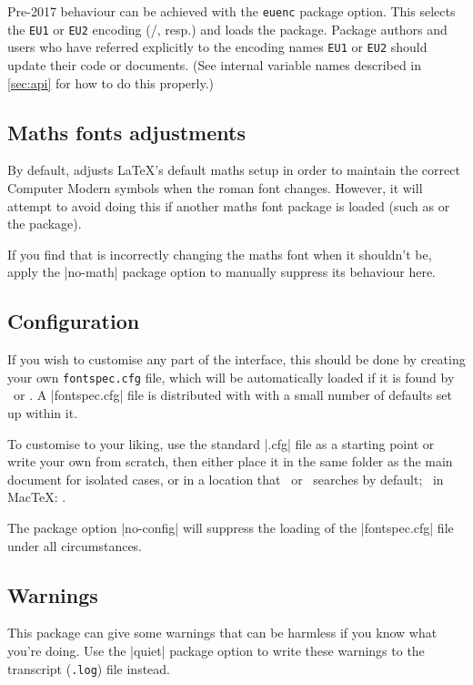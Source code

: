 \documentclass[a4paper]{l3doc}
\begin{document}
Pre-2017 behaviour can be achieved with the \texttt{euenc} package option.
This selects the \texttt{EU1} or \texttt{EU2} encoding (\XeTeX/\LuaTeX, resp.) and loads the  package.
Package authors and users who have referred explicitly to the encoding names \texttt{EU1} or \texttt{EU2} should update their code or documents.
(See internal variable names described in \vref{sec:api} for how to do this properly.)


\subsection{Maths fonts adjustments}
By default,  adjusts \LaTeX's default maths setup in order to maintain the correct Computer Modern symbols when the roman font changes.
However, it will attempt to avoid doing this if another maths font package is loaded (such as  or the  package).

If you find that  is incorrectly changing the maths font when it shouldn't be, apply the |no-math| package option to manually suppress its behaviour here.


\subsection{Configuration}
\label{sec:config}

If you wish to customise any part of the
 interface, this should be done by creating your own
\texttt{fontspec.cfg} file,
which will be automatically loaded if it is found by \XeTeX\ or \LuaTeX.
A |fontspec.cfg| file is distributed with  with a small number of defaults set up within it.

To customise  to your liking, use the standard |.cfg| file as a starting point or write your own from scratch, then either place it in the same folder as the main document for isolated cases, or in a location
that \XeTeX\ or \LuaTeX\ searches by default; \eg\ in Mac\TeX: .

The package option |no-config| will suppress the loading of the |fontspec.cfg| file under all circumstances.


\subsection{Warnings}
\label{sec:quiet-warnings}

This package can give some warnings that can be harmless if you know what
you're doing. Use the |quiet| package option to write these warnings to the
transcript (\texttt{.log}) file instead.
\end{document}
